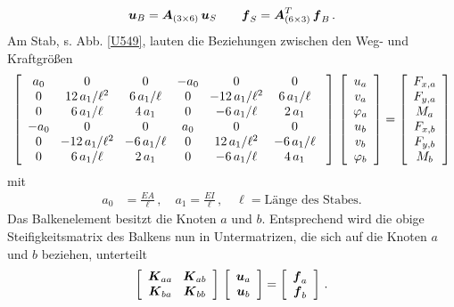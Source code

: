 {\begin{align}
\mbox{\boldmath $u$}_B = \mbox{\boldmath $A$}_{(3 \times 6)}\,\mbox{\boldmath $u$}_S \qquad \mbox{\boldmath $f$}_S = \mbox{\boldmath $A$}^T_{(6 \times 3)}\,\mbox{\boldmath $f$}_B\,.
\end{align}
Am Stab, s. Abb. \ref{U549}, lauten die Beziehungen zwischen den Weg- und Kraftgr\"{o}{\ss}en
\begin{align}
\left[\barr{c @{\hspace{3mm}} c @{\hspace{3mm}} c @{\hspace{3mm}} c @{\hspace{3mm}} c @{\hspace{3mm}} c @{\hspace{3mm}} c @{\hspace{3mm}} c} a_0 & 0 & 0 &- a_0 & 0 & 0 \\
0 & 12\,a_1/\ell^2 & 6\,a_1/\ell & 0 &-12\,a_1/\ell^2& 6\,a_1/\ell \\
0 &6\,a_1/\ell & 4\,a_1 & 0 &-6\,a_1/\ell & 2\,a_1 \\
-a_0 & 0 & 0 & a_0 & 0 & 0 \\
0 & -12\,a_1/\ell^2 & -6\,a_1/\ell & 0 &12\,a_1/\ell^2& -6\,a_1/\ell \\
0 &6\,a_1/\ell & 2\,a_1 & 0 &-6\,a_1/\ell & 4\,a_1
\earr \right]\,\left[\barr{c} u_a \\ v_a \\ \Np_a \\ u_b \\v_b \\ \Np_b \earr \right] =
\left[\barr{c} F_{x,a} \\ F_{y,a} \\ M_a \\ F_{x,b} \\ F_{y,b} \\ M_b\earr \right]
\end{align}
mit
\begin{align}
a_0 &= \frac{E A}{\ell}\,, \quad a_1 = \frac{E I}{\ell}\,,  \quad \ell = \text{L\"{a}nge des Stabes}.
\end{align}
Das Balkenelement besitzt die Knoten $a $ und $b $. Entsprechend wird die obige Steifigkeitsmatrix des Balkens nun in Untermatrizen, die sich auf die Knoten $a $ und $b $ beziehen, unterteilt
\begin{align} \label{Eq30}
\left[\barr{c @{\hspace{3mm}} c } \vek K_{aa} & \vek K_{ab} \\
\vek K_{ba} &\vek K_{bb}\earr \right]\,\left[\barr{c} \vek u_a \\ \vek u_b\earr \right] = \left[\barr{c} \vek f_a \\ \vek f_b\earr \right]\,.

\end{align}}
